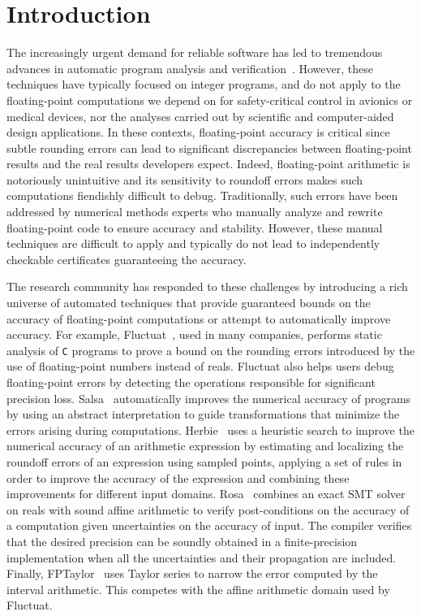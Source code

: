\documentclass[main.tex]{subfiles}
\begin{document}
\section{Introduction}
\label{sec:intro}

The increasingly urgent demand for reliable software has led to tremendous
advances in automatic program analysis and verification~\cite{cmbc,astre,klee,coverity,mars-code}.
However, these techniques have typically focused on integer programs, and do
not apply to the floating-point computations we depend on for
safety-critical control in avionics or medical devices, nor the analyses
carried out by scientific and computer-aided design applications.  In these
contexts, floating-point accuracy is critical since subtle rounding errors
can lead to significant discrepancies between floating-point results and
the real results developers expect.  Indeed, floating-point
arithmetic is notoriously unintuitive and its sensitivity to roundoff
errors makes such computations fiendishly difficult to debug.
Traditionally, such errors have been addressed by numerical methods experts
who manually analyze and rewrite floating-point code to ensure accuracy and
stability.  However, these manual techniques are difficult to apply and
typically do not lead to independently checkable certificates guaranteeing
the accuracy.

The research community has responded to these challenges by introducing
a rich universe of automated techniques that provide guaranteed bounds on the
accuracy of floating-point computations or attempt to automatically improve
accuracy.  For example, Fluctuat~\cite{Goubault13,GMP06}, used in
many companies, performs static analysis of \texttt{C} programs to prove
a bound on the rounding errors introduced by the use of
floating-point numbers instead of reals.  Fluctuat also helps users
debug floating-point errors by detecting the operations responsible for
significant precision loss.  Salsa~\cite{fmics15} automatically improves
the numerical accuracy of programs by using an abstract interpretation to
guide transformations that minimize the errors arising during
computations.  Herbie~\cite{pavel15} uses a heuristic search to improve the numerical
accuracy of an arithmetic expression by estimating and
localizing the roundoff errors of an expression using sampled points,
applying a set of rules in order to improve the accuracy of the expression
and combining these improvements for different input domains.
Rosa~\cite{DaruloveK14} combines
an exact SMT solver on reals with sound affine arithmetic to verify
post-conditions on the accuracy of a computation
given uncertainties on the accuracy of input.  The compiler verifies that the desired precision
can be soundly obtained in a finite-precision implementation when all the
uncertainties and their propagation are included.  Finally,
FPTaylor~\cite{fptaylor-fm15} uses Taylor series to narrow
the error computed by the interval arithmetic.  This competes with the
affine arithmetic domain used by Fluctuat.
\end{document}
